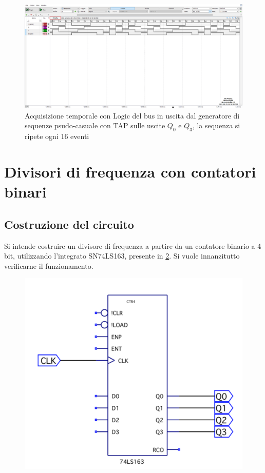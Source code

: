 \documentclass[10pt, a4paper, italian]{article}
\begin{document}
\begin{figure}[htbp]
\centering
	\includegraphics[width=\textwidth]{4.b_30}
	\caption{Acquisizione temporale con Logic del bus in uscita dal generatore di sequenze psudo-casuale con TAP sulle uscite $Q_0$ e $Q_3$, la sequenza si ripete ogni 16 eventi \label{fig: TAP_30}}
\end{figure}

\section{Divisori di frequenza con contatori binari}
\subsection{Costruzione del circuito}
Si intende costruire un divisore di frequenza a partire da un contatore binario a 4 bit, utilizzando l'integrato SN74LS163, presente in \cref{fig: schem_counter}. Si vuole innanzitutto verificarne il funzionamento. 
\begin{figure}[htbp]
\centering
	\includegraphics[width=\textwidth]{schem_con}
	\caption{\label{fig: schem_counter}}
\end{figure}
\end{document}
